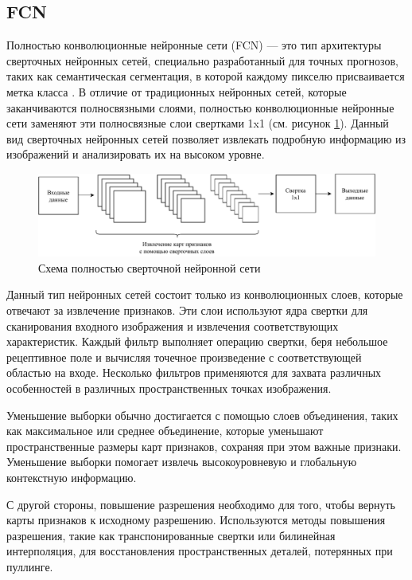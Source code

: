 \subsection{FCN}

Полностью конволюционные нейронные сети (FCN) --- это тип архитектуры сверточных нейронных сетей, специально разработанный для точных прогнозов, таких как семантическая сегментация, в которой каждому пикселю присваивается метка класса \cite{fcns}. В отличие от традиционных нейронных сетей, которые заканчиваются полносвязными слоями, полностью конволюционные нейронные сети заменяют эти полносвязные слои свертками 1x1 (см. рисунок \ref{fig:fcn_scheme}). Данный вид сверточных нейронных сетей позволяет извлекать подробную информацию из изображений и анализировать их на высоком уровне. 

\begin{figure}[h!btp]
	\centering
	\includegraphics[scale = 0.75]{inc/analysis/fcn_scheme.pdf}
	\caption{Схема полностью сверточной нейронной сети}
	\label{fig:fcn_scheme}	
\end{figure}

Данный тип нейронных сетей состоит только из конволюционных слоев, которые отвечают за извлечение признаков. Эти слои используют ядра свертки для сканирования входного изображения и извлечения соответствующих характеристик. Каждый фильтр выполняет операцию свертки, беря небольшое рецептивное поле и вычисляя точечное произведение с соответствующей областью на входе. Несколько фильтров применяются для захвата различных особенностей в различных пространственных точках изображения.

Уменьшение выборки обычно достигается с помощью слоев объединения, таких как максимальное или среднее объединение, которые уменьшают пространственные размеры карт признаков, сохраняя при этом важные признаки. Уменьшение выборки помогает извлечь высокоуровневую и глобальную контекстную информацию.

С другой стороны, повышение разрешения необходимо для того, чтобы вернуть карты признаков к исходному разрешению. Используются методы повышения разрешения, такие как транспонированные свертки или билинейная интерполяция, для восстановления пространственных деталей, потерянных при пуллинге.

